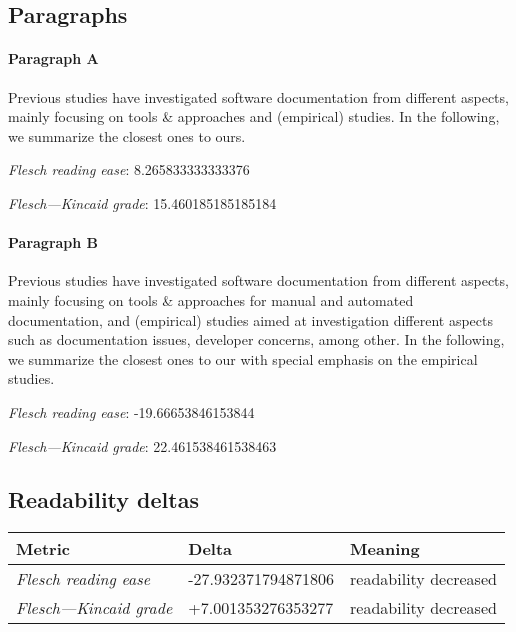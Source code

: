 \subsection{Paragraphs}
\paragraph{Paragraph A}
Previous studies have investigated software documentation from different aspects, mainly focusing on tools \& approaches and (empirical) studies. In the following, we summarize the closest ones to ours.\par\medskip\emph{Flesch reading ease}: 8.265833333333376\par\emph{Flesch---Kincaid grade}: 15.460185185185184

\paragraph{Paragraph B}
Previous studies have investigated software documentation from different aspects, mainly focusing on tools \& approaches for manual and automated documentation, and (empirical) studies aimed at investigation different aspects such as documentation issues, developer concerns, among other. In the following, we summarize the closest ones to our with special emphasis on the empirical studies.\par\medskip\emph{Flesch reading ease}: -19.66653846153844\par\emph{Flesch---Kincaid grade}: 22.461538461538463

\subsection{Readability deltas}

\begin{tabular}{lll}
\toprule
               \textbf{Metric} &       \textbf{Delta} &       \textbf{Meaning} \\
\midrule
    \emph{Flesch reading ease} &  -27.932371794871806 &  readability decreased \\
 \emph{Flesch---Kincaid grade} &   +7.001353276353277 &  readability decreased \\
\bottomrule
\end{tabular}

